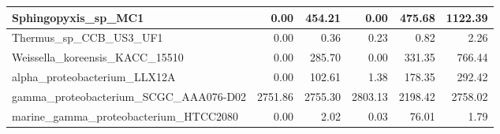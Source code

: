 \documentclass[12pt,a4paper]{article}
\begin{document}
\begin{table}[ht]
\begin{center}
\begin{tabular}{|l*{5}{|r}|}
Sphingopyxis\_sp\_MC1 & 0.00 & 454.21 & 0.00 & 475.68 & 1122.39 \\ \hline
Thermus\_sp\_CCB\_US3\_UF1 & 0.00 & 0.36 & 0.23 & 0.82 & 2.26 \\ \hline
Weissella\_koreensis\_KACC\_15510 & 0.00 & 285.70 & 0.00 & 331.35 & 766.44 \\ \hline
alpha\_proteobacterium\_LLX12A & 0.00 & 102.61 & 1.38 & 178.35 & 292.42 \\ \hline
gamma\_proteobacterium\_SCGC\_AAA076-D02 & 2751.86 & 2755.30 & 2803.13 & 2198.42 & 2758.02 \\ \hline
marine\_gamma\_proteobacterium\_HTCC2080 & 0.00 & 2.02 & 0.03 & 76.01 & 1.79 \\ \hline
\end{tabular}
\end{center}
\end{table}
\end{document}
